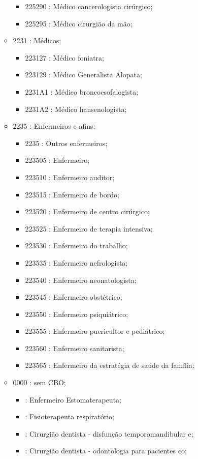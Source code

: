 \begin{itemize}
\begin{itemize}
\begin{itemize}
      \item 225290 : Médico cancerologista cirúrgico;
      \item 225295 : Médico cirurgião da mão;
    \end{itemize}
    \item 2231 : Médicos;
    \begin{itemize}
      \item 223127 : Médico foniatra;
      \item 223129 : Médico Generalista Alopata;
      \item 2231A1 : Médico broncoesofalogista;
      \item 2231A2 : Médico hansenologista;
    \end{itemize}
    \item 2235 : Enfermeiros e afins;
    \begin{itemize}
      \item 2235 : Outros enfermeiros;
      \item 223505 : Enfermeiro;
      \item 223510 : Enfermeiro auditor;
      \item 223515 : Enfermeiro de bordo;
      \item 223520 : Enfermeiro de centro cirúrgico;
      \item 223525 : Enfermeiro de terapia intensiva;
      \item 223530 : Enfermeiro do trabalho;
      \item 223535 : Enfermeiro nefrologista;
      \item 223540 : Enfermeiro neonatologista;
      \item 223545 : Enfermeiro obstétrico;
      \item 223550 : Enfermeiro psiquiátrico;
      \item 223555 : Enfermeiro puericultor e pediátrico;
      \item 223560 : Enfermeiro sanitarista;
      \item 223565 : Enfermeiro da estratégia de saúde da família;
    \end{itemize}
    \item 0000 : sem CBO;
    \begin{itemize}
      \item  : Enfermeiro Estomaterapeuta;
      \item  : Fisioterapeuta respiratório;
      \item  : Cirurgião dentista - disfunção temporomandibular e;
      \item  : Cirurgião dentista - odontologia para pacientes co;

\end{itemize}
\end{itemize}
\end{itemize}
